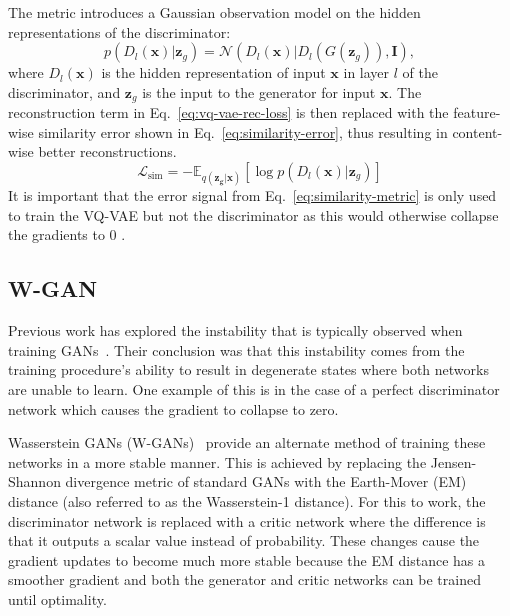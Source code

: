 \documentclass{article}
\begin{document}
The metric introduces a Gaussian observation model on the hidden representations of the discriminator:
\begin{equation}
    \label{eq:similarity-metric}
    p(D_l(\mathbf{x})|\mathbf{z}_g) = \mathcal{N}(D_l(\mathbf{x})|D_l(G(\mathbf{z}_g)), \mathbf{I}),
\end{equation}
where $D_l(\mathbf{x})$ is the hidden representation of input $\mathbf{x}$ in layer $l$ of the discriminator, and $\mathbf{z}_g$ is the input to the generator for input $\mathbf{x}$. 
The reconstruction term in Eq.~\ref{eq:vq-vae-rec-loss} is then replaced with the feature-wise similarity error shown in Eq.~\ref{eq:similarity-error}, thus resulting in content-wise better reconstructions.
\begin{equation}
    \label{eq:similarity-error}
    \mathcal{L}_{\text{sim}} = - \mathbb{E}_{q(\mathbf{z_g}|\mathbf{x})}[\log p(D_l(\mathbf{x})|\mathbf{z}_g)]
\end{equation}
It is important that the error signal from Eq.~\ref{eq:similarity-metric} is only used to train the VQ-VAE but not the discriminator as this would otherwise collapse the gradients to 0 \citep{Larsen2015}.


\subsection{W-GAN}
\label{sec:methodology:w-gan}
Previous work has explored the instability that is typically observed when training GANs~\cite{arjovsky2017towards}.
Their conclusion was that this instability comes from the training procedure's ability to result in degenerate states where both networks are unable to learn. One example of this is in the case of a perfect discriminator network which causes the gradient to collapse to zero.

Wasserstein GANs (W-GANs)~\cite{Arjovsky2017} provide an alternate method of training these networks in a more stable manner. This is achieved by replacing the Jensen-Shannon divergence metric of standard GANs with the Earth-Mover (EM) distance (also referred to as the Wasserstein-1 distance). For this to work, the discriminator network is replaced with a critic network where the difference is that it outputs a scalar value instead of probability. These changes cause the gradient updates to become much more stable because the EM distance has a smoother gradient and both the generator and critic networks can be trained until optimality.
\end{document}
